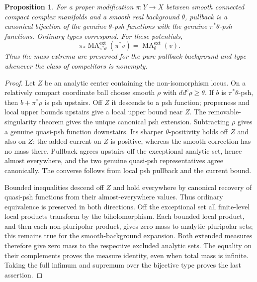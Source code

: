 \documentclass[11pt]{article}
\newtheorem{proposition}{Proposition}
\newcommand{\ddc}{dd^c}
\newcommand{\MA}{\operatorname{MA}}
\newcommand{\ext}{\mathrm{ext}}
\begin{document}
\begin{proposition}\label{prop:mod}
For a proper modification $\pi:Y\to X$ between smooth connected compact
complex manifolds and a smooth real background $\theta$, pullback is a
canonical bijection of the genuine $\theta$-psh functions with the genuine
$\pi^*\theta$-psh functions. Ordinary types correspond. For these
potentials,
\[
 \pi_*\MA_{\pi^*\theta}^{\ext}(\pi^*v)=\MA_\theta^{\ext}(v).
\]
Thus the mass extrema are preserved for the pure pullback background and
type whenever the class of competitors is nonempty.
\end{proposition}
\begin{proof}
Let $Z$ be an analytic center containing the non-isomorphism locus.
On a relatively compact coordinate ball choose smooth $\rho$ with
$\ddc\rho\geq\theta$. If $b$ is $\pi^*\theta$-psh, then
$b+\pi^*\rho$ is psh upstairs. Off $Z$ it descends to a psh function;
properness and local upper bounds upstairs give a local upper bound near
$Z$. The removable-singularity theorem \cite[I.5.23--5.24]{Demailly}
gives the unique canonical psh extension. Subtracting $\rho$ gives a genuine
quasi-psh function downstairs. Its sharper $\theta$-positivity holds off
$Z$ and also on $Z$: the added current on $Z$ is positive, whereas the
smooth correction has no mass there. Pullback agrees upstairs off the
exceptional analytic set, hence almost everywhere, and the two genuine
quasi-psh representatives agree canonically. The converse follows from
local psh pullback and the current bound.

Bounded inequalities descend off $Z$ and hold everywhere by canonical
recovery of quasi-psh functions from their almost-everywhere values. Thus
ordinary equivalence is preserved in both directions. Off the exceptional
set all finite-level local products transform by the biholomorphism.
Each bounded local product, and then each non-pluripolar product, gives
zero mass to analytic pluripolar sets; this remains true for the
smooth-background expansion. Both extended measures therefore give zero
mass to the respective excluded analytic sets. The equality on their
complements proves the measure identity, even when total mass is infinite.
Taking the full infimum and supremum over the bijective type proves the
last assertion.
\end{proof}
\end{document}
